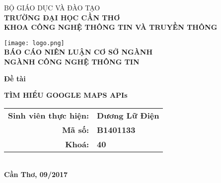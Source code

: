 \documentclass[../thesis.tex]{subfiles}
\begin{document}
\begin{titlepage}

\begin{center}

BỘ GIÁO DỤC VÀ ĐÀO TẠO\\
\textbf{TRƯỜNG ĐẠI HỌC CẦN THƠ\\}
\textbf{KHOA CÔNG NGHỆ THÔNG TIN VÀ TRUYỀN THÔNG\\[1cm]}

\texttt{[image: logo.png]}\\[1cm]

\textbf{BÁO CÁO NIÊN LUẬN CƠ SỞ NGÀNH\\}
\textbf{NGÀNH CÔNG NGHỆ THÔNG TIN\\[2cm]}

\begin{large}
\textbf{Đề tài\\[0.5cm]}
\end{large}
\textbf{{\LARGE TÌM HIỂU GOOGLE MAPS APIs}}
\\[4cm]

\begin{tabular}{ r l }
\textbf{Sinh viên thực hiện:} & \textbf{Dương Lữ Điện}\\ 
\textbf{Mã số:} & \textbf{B1401133}\\  
\textbf{Khoá:} & \textbf{40}   
\end{tabular}
\\[4cm]

\textbf{Cần Thơ, 09/2017}

\end{center}

\end{titlepage}
\end{document}
